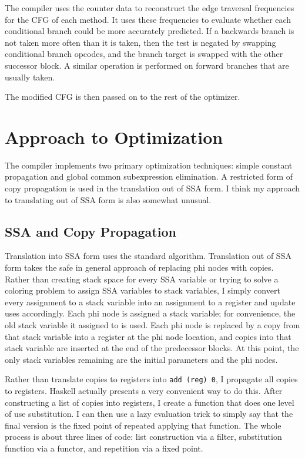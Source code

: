 \documentclass{article}
\begin{document}
The compiler uses the counter data to reconstruct the 
edge traversal frequencies for the CFG of each method.
It uses these frequencies to evaluate whether each conditional branch could be more accurately predicted.
If a backwards branch is not taken more often than it is taken,
then the test is negated by swapping conditional branch opcodes,
and the branch target is swapped with the other successor block.
A similar operation is performed on forward branches that are usually taken.

The modified CFG is then passed on to the rest of the optimizer.

\section{Approach to Optimization}
The compiler implements two primary optimization techniques: 
simple constant propagation and global common subexpression elimination. 
A restricted form of copy propagation is used in the translation out of SSA form.
I think my approach to translating out of SSA form is also somewhat unusual.

\subsection{SSA and Copy Propagation}
Translation into SSA form uses the standard algorithm.
Translation out of SSA form takes the safe in general approach of replacing phi nodes with copies.
Rather than creating stack space for every SSA variable or trying to solve a coloring problem
to assign SSA variables to stack variables, I simply convert every assignment to a stack variable
into an assignment to a register and update uses accordingly.
Each phi node is assigned a stack variable; 
for convenience, the old stack variable it assigned to is used.
Each phi node is replaced by a copy from that stack variable into a register at the phi node location, 
and copies into that stack variable are inserted at the end of the predecessor blocks.
At this point, the only stack variables remaining are the initial parameters and the phi nodes.

Rather than translate copies to registers into \texttt{add (reg) 0}, I propagate all copies to registers.
Haskell actually presents a very convenient way to do this.
After constructing a list of copies into registers, 
I create a function that does one level of use substitution.
I can then use a lazy evaluation trick to simply say that the final version 
is the fixed point of repeated applying that function. 
The whole process is about three lines of code: list construction via a filter, 
substitution function via a functor, and repetition via a fixed point.
\end{document}
